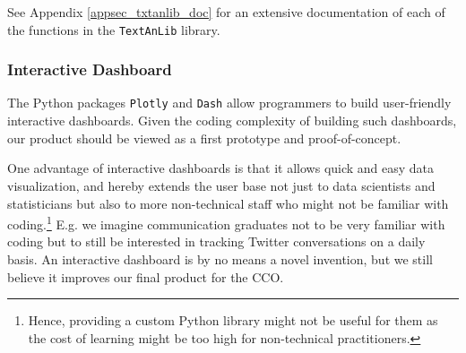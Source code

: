 \begin{itemize}
                
                
                
                
                
        \end{itemize}
        
        \noindent See Appendix \ref{appsec_txtanlib_doc} for an extensive documentation of each of the functions in the \texttt{TextAnLib} library.
    
    
    \subsubsection{Interactive Dashboard}\label{sec_tool_dash}
        The Python packages \texttt{Plotly} and \texttt{Dash} allow programmers to build user-friendly interactive dashboards. Given the coding complexity of building such dashboards, our product should be viewed as a first prototype and proof-of-concept.
        
            \newline\indent
        One advantage of interactive dashboards is that it allows quick and easy data visualization, and hereby extends the user base not just to data scientists and statisticians but also to more non-technical staff who might not be familiar with coding.\footnote{Hence, providing a custom Python library might not be useful for them as the cost of learning might be too high for non-technical practitioners.} E.g. we imagine communication graduates not to be very familiar with coding but to still be interested in tracking Twitter conversations on a daily basis. An interactive dashboard is by no means a novel invention, but we still believe it improves our final product for the CCO.
        
